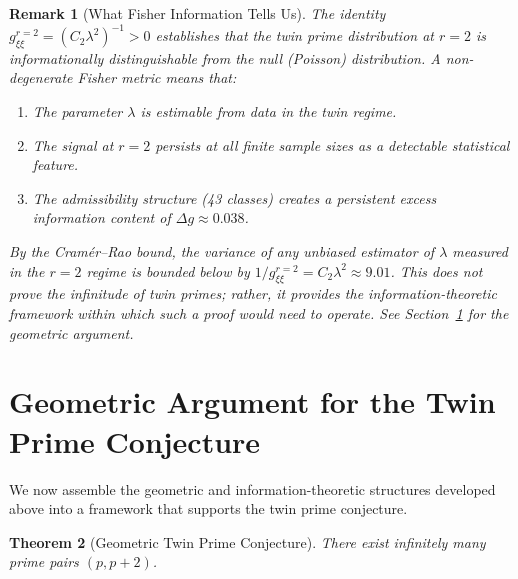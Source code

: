 \documentclass[12pt]{article}
\newtheorem{theorem}{Theorem}[section]
\newtheorem{remark}[theorem]{Remark}
\begin{document}
\begin{remark}[What Fisher Information Tells Us]
The identity $g_{\xi\xi}^{r=2} = (C_2\lambda^2)^{-1} > 0$ establishes that the
twin prime distribution at $r=2$ is \textit{informationally distinguishable}
from the null (Poisson) distribution. A non-degenerate Fisher metric means that:
\begin{enumerate}
  \item The parameter $\lambda$ is estimable from data in the twin regime.
  \item The signal at $r=2$ persists at all finite sample sizes as a detectable
    statistical feature.
  \item The admissibility structure (43 classes) creates a persistent excess
    information content of $\Delta g \approx 0.038$.
\end{enumerate}
By the Cram\'er--Rao bound, the variance of any unbiased estimator of $\lambda$
measured in the $r=2$ regime is bounded below by $1/g_{\xi\xi}^{r=2} = C_2\lambda^2
\approx 9.01$. This does \textit{not} prove the infinitude of twin primes;
rather, it provides the information-theoretic framework within which such a
proof would need to operate. See Section~\ref{sec:geometric_argument} for the
geometric argument.
\end{remark}

\section{Geometric Argument for the Twin Prime Conjecture}
\label{sec:geometric_argument}

We now assemble the geometric and information-theoretic structures developed
above into a framework that supports the twin prime conjecture.

\begin{theorem}[Geometric Twin Prime Conjecture]
There exist infinitely many prime pairs $(p, p+2)$.
\end{theorem}
\end{document}
